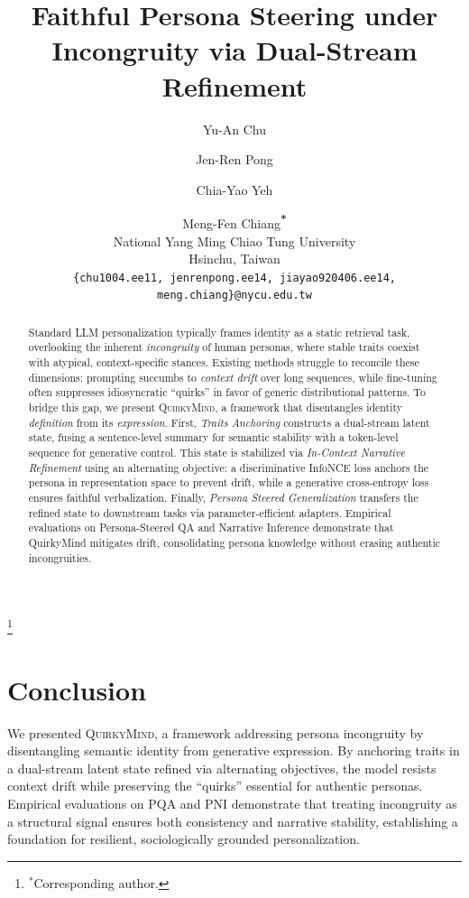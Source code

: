 \documentclass[11pt]{article}
\title{Faithful Persona Steering under Incongruity via Dual-Stream Refinement}
\author{Yu-An Chu \and Jen-Ren Pong \and Chia-Yao Yeh \and Meng-Fen Chiang\textsuperscript{\textbf{*}}\\
  National Yang Ming Chiao Tung University \\
  Hsinchu, Taiwan \\
  \texttt{\{chu1004.ee11, jenrenpong.ee14, jiayao920406.ee14, meng.chiang\}@nycu.edu.tw} \\}
\newcommand\blfootnote[1]{%
  \begingroup
  \renewcommand\thefootnote{}\footnote{#1}%
  \addtocounter{footnote}{-1}%
  \endgroup
}
\begin{document}
\maketitle

\blfootnote{$^*$Corresponding author.}

\begin{abstract}
Standard LLM personalization typically frames identity as a static retrieval task, overlooking the inherent \textit{incongruity} of human personas, where stable traits coexist with atypical, context-specific stances. Existing methods struggle to reconcile these dimensions: prompting succumbs to \textit{context drift} over long sequences, while fine-tuning often suppresses idiosyncratic ``quirks'' in favor of generic distributional patterns. To bridge this gap, we present \textsc{QuirkyMind}, a framework that disentangles identity \textit{definition} from its \textit{expression}. First, \textit{Traits Anchoring} constructs a dual-stream latent state, fusing a sentence-level summary for semantic stability with a token-level sequence for generative control. This state is stabilized via \textit{In-Context Narrative Refinement} using an alternating objective: a discriminative InfoNCE loss anchors the persona in representation space to prevent drift, while a generative cross-entropy loss ensures faithful verbalization. Finally, \textit{Persona Steered Generalization} transfers the refined state to downstream tasks via parameter-efficient adapters. Empirical evaluations on Persona-Steered QA and Narrative Inference demonstrate that QuirkyMind mitigates drift, consolidating persona knowledge without erasing authentic incongruities.
\end{abstract}













\section{Conclusion}
We presented \textsc{QuirkyMind}, a framework addressing persona incongruity by disentangling semantic identity from generative expression. By anchoring traits in a dual-stream latent state refined via alternating objectives, the model resists context drift while preserving the ``quirks'' essential for authentic personas. Empirical evaluations on PQA and PNI demonstrate that treating incongruity as a structural signal ensures both consistency and narrative stability, establishing a foundation for resilient, sociologically grounded personalization. 
\end{document}
